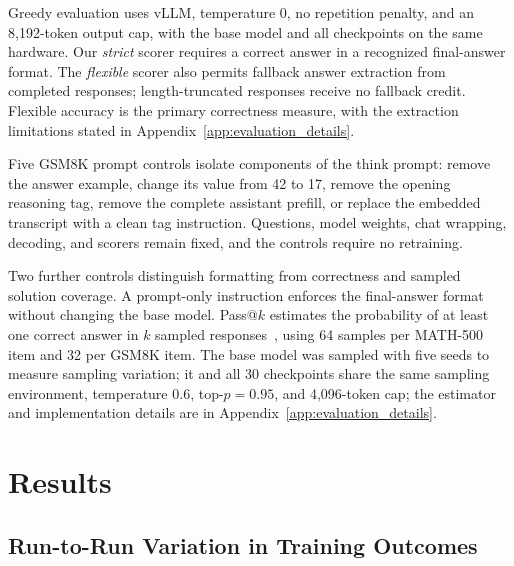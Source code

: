 \documentclass[ai,article,submit,oneauthor]{Definitions/mdpi}
\begin{document}
Greedy evaluation uses vLLM, temperature 0, no repetition penalty, and an 8,192-token output cap, with the base model and all checkpoints on the same hardware. Our \emph{strict} scorer requires a correct answer in a recognized final-answer format. The \emph{flexible} scorer also permits fallback answer extraction from completed responses; length-truncated responses receive no fallback credit. Flexible accuracy is the primary correctness measure, with the extraction limitations stated in Appendix~\ref{app:evaluation_details}.

Five GSM8K prompt controls isolate components of the think prompt: remove the answer example, change its value from 42 to 17, remove the opening reasoning tag, remove the complete assistant prefill, or replace the embedded transcript with a clean tag instruction. Questions, model weights, chat wrapping, decoding, and scorers remain fixed, and the controls require no retraining.

Two further controls distinguish formatting from correctness and sampled solution coverage. A prompt-only instruction enforces the final-answer format without changing the base model. Pass@$k$ estimates the probability of at least one correct answer in $k$ sampled responses~\cite{brown2024monkeys}, using 64 samples per MATH-500 item and 32 per GSM8K item. The base model was sampled with five seeds to measure sampling variation; it and all 30 checkpoints share the same sampling environment, temperature 0.6, top-$p=0.95$, and 4,096-token cap; the estimator and implementation details are in Appendix~\ref{app:evaluation_details}.

\section{Results}\label{sec:results}

\subsection{Run-to-Run Variation in Training Outcomes}\label{sec:training_outcomes}
\end{document}
